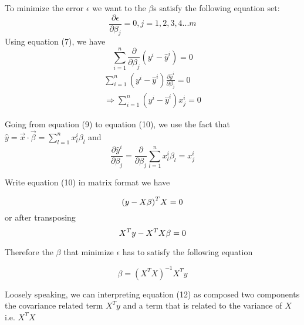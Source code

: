 \documentclass[12pt, oneside]{article}
\begin{document}
To minimize the error $\epsilon$ we want to the ${\beta}$s satisfy the following equation set:
$$
\frac{\partial \epsilon}{\partial \beta_j}=0, j=1, 2, 3, 4 ... m
$$
Using equation (7), we have 
$$
{\sum\limits_{i=1}^{n}\frac{\partial}{\partial \beta_j}(y^{i}-\hat{y}^{i})=0}
$$
\begin{align}
\sum\limits_{i=1}^{n}(y^{i}-\hat{y}^{i})\frac{\partial\hat{y}^{i}}{\partial \beta_j}=0\\
\Rightarrow
\sum\limits_{i=1}^{n}(y^{i}-\hat{y}^{i})x^{i}_{j}=0
\end{align}

Going from equation (9) to equation (10), we use the fact that $\hat{y}=\vec{x}\cdot\vec{\beta}=\sum\limits_{l=1}^{n}x_l^i\beta_l$ and
\begin{equation}
\frac{\partial{\hat{y}^i}}{\partial{\beta_j}}=\frac{\partial}{\partial \beta_j}\sum\limits_{l=1}^{n}x_l^i\beta_l=x_j^i
\end{equation}

Write equation (10) in matrix format we have

$$
\mathnormal{(y-X \beta)}^{T}\mathnormal{X}=0
$$
or after transposing
$$
\mathnormal{X^{T}}\mathnormal{y}-\mathnormal{X^T}\mathnormal{X}\beta=0
$$

Therefore the $\beta$ that minimize $\epsilon$ has to satisfy the following equation

\begin{equation}
\beta=({X^T}{X})^{-1}{X^{T}}{y}
\end{equation}

Loosely speaking, we can interpreting equation (12) as composed two components the covariance related term $X^{T}y$ and a term that is related to the variance of $X$ i.e. ${X^T}{X}$
\end{document}
